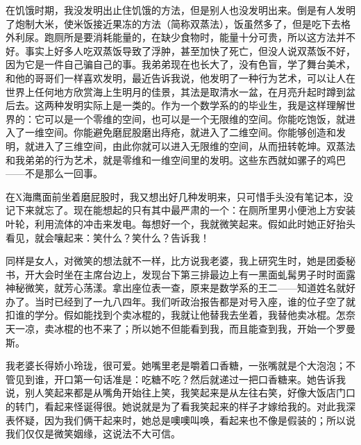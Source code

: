 在饥饿时期，我没发明出止住饥饿的方法，但是别人也没发明出来。倒是有人发明了炮制大米，使米饭接近果冻的方法（简称双蒸法），饭虽然多了，但是吃下去格外利尿。跑厕所是要消耗能量的，在缺少食物时，能量十分可贵，所以这方法并不好。事实上好多人吃双蒸饭导致了浮肿，甚至加快了死亡，但没人说双蒸饭不好，因为它是一件自己骗自己的事。我弟弟现在也长大了，没有色盲，学了舞台美术，和他的哥哥们一样喜欢发明，最近告诉我说，他发明了一种行为艺术，可以让人在世界上任何地方欣赏海上生明月的佳景，其法是取清水一盆，在月亮升起时蹲到盆后去。这两种发明实际上是一类的。作为一个数学系的的毕业生，我是这样理解世界的：它可以是一个零维的空间，也可以是一个无限维的空间。你能吃饱饭，就进入了一维空间。你能避免磨屁股磨出痔疮，就进入了二维空间。你能够创造和发明，就进入了三维空间，由此你就可以进入无限维的空间，从而扭转乾坤。双蒸法和我弟弟的行为艺术，就是零维和一维空间里的发明。这些东西就如骡子的鸡巴——不是那么一回事。 

在X海鹰面前坐着磨屁股时，我又想出好几种发明来，只可惜手头没有笔记本，没记下来就忘了。现在能想起的只有其中最严肃的一个：在厕所里男小便池上方安装叶轮，利用流体的冲击来发电。每想好一个，我就微笑起来。假如此时她正好抬头看见，就会嚷起来：笑什么？笑什么？告诉我！ 

同样是女人，对微笑的想法就不一样，比方说我老婆，我上研究生时，她是团委秘书，开大会时坐在主席台边上，发现台下第三排最边上有一黑面虬髯男子时时面露神秘微笑，就芳心荡漾。拿出座位表一查，原来是数学系的王二——知道姓名就好办了。当时已经到了一九八四年。我们听政治报告都是对号入座，谁的位子空了就扣谁的学分。假如能找到个卖冰棍的，我就让他替我去坐着，我替他卖冰棍。怎奈天一凉，卖冰棍的也不来了；所以她不但能看到我，而且能查到我，开始一个罗曼斯。 

我老婆长得娇小玲珑，很可爱。她嘴里老是嚼着口香糖，一张嘴就是个大泡泡；不管见到谁，开口第一句话准是：吃糖不吃？然后就递过一把口香糖来。她告诉我说，别人笑起来都是从嘴角开始往上笑，我笑起来是从左往右笑，好像大饭店门口的转门，看起来怪诞得很。她说就是为了看我笑起来的样子才嫁给我的。对此我深表怀疑，因为我们俩干起来时，她总是噢噢叫唤，看起来也不像是假装的；所以说我们仅仅是微笑姻缘，这说法不大可信。 

